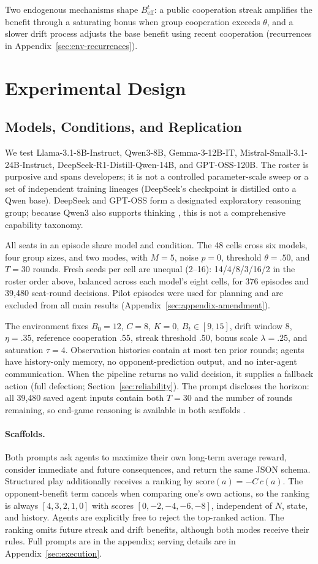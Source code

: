 \documentclass[11pt]{article}
\begin{document}
Two endogenous mechanisms shape $B^t_{\text{eff}}$: a public cooperation streak amplifies the benefit through a saturating bonus when group cooperation exceeds $\theta$, and a slower drift process adjusts the base benefit using recent cooperation (recurrences in Appendix~\ref{sec:env-recurrences}).

\section{Experimental Design}
\label{sec:design}
\subsection{Models, Conditions, and Replication}
We test Llama-3.1-8B-Instruct, Qwen3-8B, Gemma-3-12B-IT, Mistral-Small-3.1-24B-Instruct, DeepSeek-R1-Distill-Qwen-14B, and GPT-OSS-120B. The roster is purposive and spans developers; it is not a controlled parameter-scale sweep or a set of independent training lineages (DeepSeek's checkpoint is distilled onto a Qwen base). DeepSeek and GPT-OSS form a designated exploratory reasoning group; because Qwen3 also supports thinking \citep{qwen32025}, this is not a comprehensive capability taxonomy.

All seats in an episode share model and condition. The 48 cells cross six models, four group sizes, and two modes, with $M=5$, noise $p=0$, threshold $\theta=.50$, and $T=30$ rounds. Fresh seeds per cell are unequal (2--16): 14/4/8/3/16/2 in the roster order above, balanced across each model's eight cells, for 376 episodes and 39{,}480 seat-round decisions. Pilot episodes were used for planning and are excluded from all main results (Appendix~\ref{sec:appendix-amendment}).

The environment fixes $B_0=12$, $C=8$, $K=0$, $B_t\in[9,15]$, drift window 8, $\eta=.35$, reference cooperation .55, streak threshold .50, bonus scale $\lambda=.25$, and saturation $\tau=4$. Observation histories contain at most ten prior rounds; agents have history-only memory, no opponent-prediction output, and no inter-agent communication. When the pipeline returns no valid decision, it supplies a fallback action (full defection; Section~\ref{sec:reliability}). The prompt discloses the horizon: all 39{,}480 saved agent inputs contain both $T=30$ and the number of rounds remaining, so end-game reasoning is available in both scaffolds \citep{selten1986end}.

\paragraph{Scaffolds.}
Both prompts ask agents to maximize their own long-term average reward, consider immediate and future consequences, and return the same JSON schema. Structured play additionally receives a ranking by $\mathrm{score}(a)=-C\,c(a)$. The opponent-benefit term cancels when comparing one's own actions, so the ranking is always $[4,3,2,1,0]$ with scores $[0,-2,-4,-6,-8]$, independent of $N$, state, and history. Agents are explicitly free to reject the top-ranked action. The ranking omits future streak and drift benefits, although both modes receive their rules. Full prompts are in the appendix; serving details are in Appendix~\ref{sec:execution}.
\end{document}
